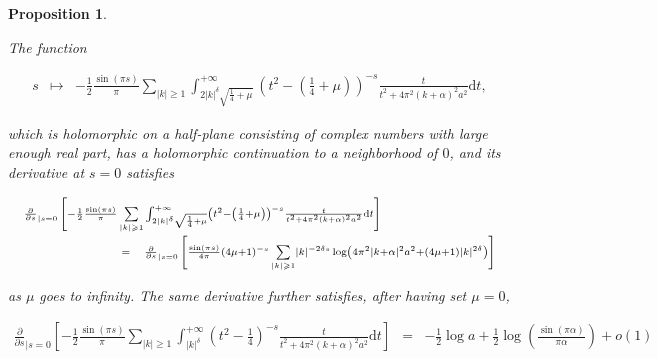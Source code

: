 \documentclass{jams-l}
\newtheorem{proposition}[theorem]{Proposition}
\theoremstyle{definition}
\theoremstyle{remark}
\numberwithin{equation}{section}
\begin{document}
                \begin{proposition}
                \label{PropMTilde3}
                
                    The function
                    
                    \[ \begin{array}{lll}
                            s & \longmapsto & - \frac{1}{2} \frac{\sin \left( \pi s \right)}{\pi} \sum\limits_{\left \vert k \right \vert \geqslant 1} \int_{2 \left \vert k \right \vert^{\delta} \sqrt{\frac{1}{4} + \mu}}^{+ \infty} \left( t^2 - \left( \frac{1}{4} + \mu \right) \right)^{-s} \frac{t}{t^2 + 4 \pi^2 \left( k + \alpha \right)^2 a^2} \mathrm{d}t,
                        \end{array} \]
                    
                    \noindent which is holomorphic on a half-plane consisting of complex numbers with large enough real part, has a holomorphic continuation to a neighborhood of $0$, and its derivative at $s=0$ satisfies
                    
                    \[ \begin{array}{lll}
                            \multicolumn{3}{l}{\scriptstyle \frac{\partial}{\partial s}_{\left \vert s = 0 \right.} \left[ - \frac{1}{2} \frac{\sin \left( \pi s \right)}{\pi} \sum\limits_{\left \vert k \right \vert \geqslant 1} \int_{2 \left \vert k \right \vert^{\delta} \sqrt{\frac{1}{4} + \mu}}^{+ \infty} \left( t^2 - \left( \frac{1}{4} + \mu \right) \right)^{-s} \frac{t}{t^2 + 4 \pi^2 \left( k + \alpha \right)^2 a^2} \mathrm{d}t \right]} \\[1em]
                            
                            \qquad \qquad \qquad & \scriptstyle = & \scriptstyle \frac{\partial}{\partial s}_{\left \vert s = 0 \right.} \left[ \frac{\sin \left( \pi s \right)}{4 \pi} \left( 4 \mu + 1 \right)^{-s} \sum\limits_{\left \vert k \right \vert \geqslant 1} \left \vert k \right \vert^{-2 \delta s} \log \left( 4 \pi^2 \left \vert k + \alpha \right \vert^2 a^2 + \left( 4 \mu + 1 \right) \left \vert k \right \vert^{2 \delta} \right) \right]
                        \end{array} \]
                    
                    \noindent as $\mu$ goes to infinity. The same derivative further satisfies, after having set $\mu = 0$,
                    
                    \[ \begin{array}{lll}
                            \scriptstyle \frac{\partial}{\partial s}_{\left \vert s = 0 \right.} \left[ - \frac{1}{2} \frac{\sin \left( \pi s \right)}{\pi} \sum\limits_{\left \vert k \right \vert \geqslant 1} \int_{\left \vert k \right \vert^{\delta}}^{+ \infty} \left( t^2 - \frac{1}{4} \right)^{-s} \frac{t}{t^2 + 4 \pi^2 \left( k + \alpha \right)^2 a^2} \mathrm{d}t \right] & \scriptstyle = & \scriptstyle - \frac{1}{2} \log a + \frac{1}{2} \log \left( \frac{\sin \left( \pi \alpha \right)}{\pi \alpha} \right) + o \left( 1 \right) 
                        \end{array} \]
                    

\end{proposition}
\end{document}

